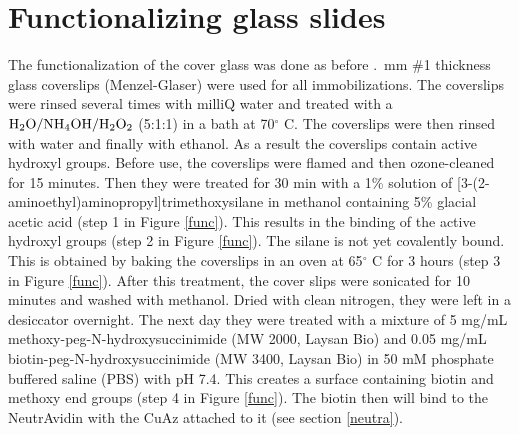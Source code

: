 \documentclass[twoside,single]{lion-msc}
\begin{document}
\section*{Functionalizing glass slides}\label{functio}
The functionalization of the cover glass was done as before \cite{Gupta2014, Zimmermann2010,Hu2001,Halliwell2001}.  \,mm \#1 thickness glass coverslips (Menzel-Glaser) were used for all immobilizations. The coverslips were rinsed several times with milliQ water and treated with a  $\textup{H}_{2}\textup{O} / \textup{NH}_{4}\textup{OH} / \textup{H}_{2}\textup{O}_{2}$ (5:1:1) in a bath at 70$^{\circ}$ C. The coverslips were then rinsed with water and finally with ethanol. As a result the coverslips contain active hydroxyl groups. Before use, the coverslips were flamed and then ozone-cleaned for 15 minutes. Then they were treated for 30 min with a 1\% solution of [3-(2-aminoethyl)aminopropyl]trimethoxysilane in methanol containing 5\% glacial acetic acid (step 1 in Figure \ref{func}). This results in the binding of the active hydroxyl groups (step 2 in Figure \ref{func}). The silane is not yet covalently bound. This is obtained by baking the coverslips in an oven at 65$^{\circ}$ C for 3 hours (step 3 in Figure \ref{func}). After this treatment, the cover slips were sonicated for 10 minutes and washed with methanol. Dried with clean nitrogen, they were left in a desiccator overnight. The next day they were treated with a mixture of 5 mg/mL methoxy-peg-N-hydroxysuccinimide (MW 2000, Laysan Bio) and 0.05 mg/mL biotin-peg-N-hydroxysuccinimide (MW 3400, Laysan Bio) in 50 mM phosphate buffered saline (PBS) with pH 7.4. 
This creates a surface containing biotin and methoxy end groups (step 4 in Figure \ref{func}). The biotin then will bind to the NeutrAvidin with the CuAz attached to it (see section \ref{neutra}). 
\end{document}
